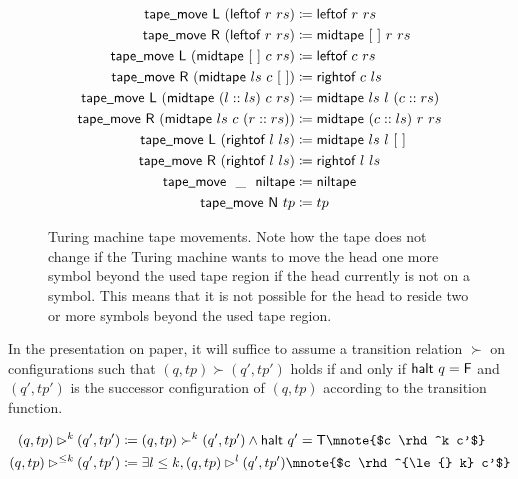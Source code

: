 \newcommand{\tmleftof}{\textsf{leftof}}
\newcommand{\tmrightof}{\textsf{rightof}}
\newcommand{\tmniltape}{\textsf{niltape}}
\newcommand{\tmmidtape}{\textsf{midtape}}
\newcommand{\shortunderscore}{\textscale{.7}{\textunderscore{}}}
\newcommand{\tapemove}{\textsf{tape\shortunderscore{}move}}
\begin{figure}
  \begin{align*}
    \tapemove~\movel~(\tmleftof~r~rs) &\defeq \tmleftof~r~rs \\
    \tapemove~\mover~(\tmleftof~r~rs) &\defeq \tmmidtape~\nil~r~rs \\
    \tapemove~\movel~(\tmmidtape~\nil~c~rs) &\defeq \tmleftof~c~rs \\
    \tapemove~\mover~(\tmmidtape~ls~c~\nil) &\defeq \tmrightof~c~ls \\
    \tapemove~\movel~(\tmmidtape~(l::ls)~c~rs) &\defeq \tmmidtape~ls~l~(c ::rs) \\
    \tapemove~\mover~(\tmmidtape~ls~c~(r::rs)) &\defeq \tmmidtape~(c::ls)~r~rs \\
    \tapemove~\movel~(\tmrightof~l~ls) &\defeq \tmmidtape~ls~l~\nil \\
    \tapemove~\mover~(\tmrightof~l~ls) &\defeq \tmrightof~l~ls \\
    \tapemove~~\_~~\tmniltape &\defeq \tmniltape \\
    \tapemove~\moven~tp &\defeq tp
  \end{align*}
  \caption{Turing machine tape movements. Note how the tape does not change if the Turing machine wants to move the head one more symbol beyond the used tape region if the head currently is not on a symbol. This means that it is not possible for the head to reside two or more symbols beyond the used tape region.}\label{fig:movetape}
\end{figure}

In the presentation on paper, it will suffice to assume a transition relation $\succ$ on configurations such that 
$(q, tp) \succ (q', tp')$ holds if and only if $\textsf{halt}~q = \mathsf{F}$ and $(q', tp')$ is the successor configuration of $(q, tp)$ according to the transition function. 
\begin{definition}
  \begin{align*}
    (q, tp) \rhd^{k} (q', tp') &\defeq (q, tp) \succ^k (q', tp') \land \textsf{halt}~q' = \btrue \mnote{$c \rhd^k c'$}\\
    (q, tp) \rhd^{\le k} (q', tp') &\defeq \exists l \le k, (q, tp) \rhd^l (q', tp')\mnote{$c \rhd^{\le{} k} c'$}
  \end{align*}
\end{definition}

